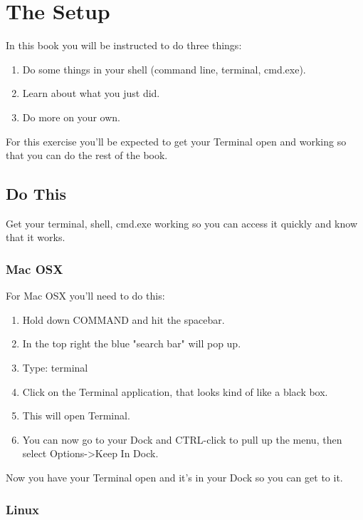 \chapter{The Setup}

In this book you will be instructed to do three things:

\begin{enumerate}
\item Do some things in your shell (command line, terminal, cmd.exe).
\item Learn about what you just did.
\item Do more on your own.
\end{enumerate}

For this exercise you'll be expected to get your Terminal open and working so that you can do
the rest of the book.

\section{Do This}

Get your terminal, shell, cmd.exe working so you can access it quickly and know that it works.

\subsection{Mac OSX}

For Mac OSX you'll need to do this:

\begin{enumerate}
\item Hold down COMMAND and hit the spacebar.
\item In the top right the blue "search bar" will pop up.
\item Type:  terminal
\item Click on the Terminal application, that looks kind of like a black box.
\item This will open Terminal.
\item You can now go to your Dock and CTRL-click to pull up the menu, then select Options->Keep In Dock.
\end{enumerate}

Now you have your Terminal open and it's in your Dock so you can get to it.

\subsection{Linux}

